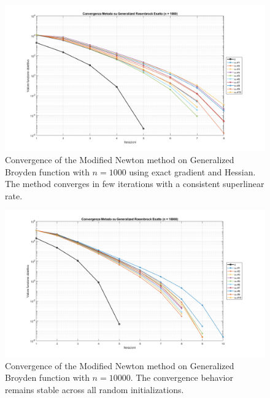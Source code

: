 \documentclass[a4paper,12pt]{article}
\begin{document}
	\begin{figure}[H]
		\centering
		\includegraphics[width=\textwidth]{../immagini/broyden_1k.png}
		\caption{Convergence of the Modified Newton method on Generalized Broyden function with $n=1000$ using exact gradient and Hessian. The method converges in few iterations with a consistent superlinear rate.}
		\label{fig:gb_1k_exact}
	\end{figure}
	
	\begin{figure}[htbp]
		\centering
		\includegraphics[width=\textwidth]{../immagini/broyden_10k.png}
		\caption{Convergence of the Modified Newton method on Generalized Broyden function with $n=10000$. The convergence behavior remains stable across all random initializations.}
		\label{fig:gb_10k_exact}
	\end{figure}
	
\end{document}
